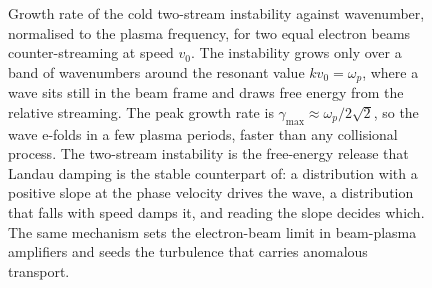 \begin{figure}[htbp]
\centering
{}
\caption[Two-stream instability growth rate]{Growth rate of the cold
two-stream instability against wavenumber, normalised to the plasma
frequency, for two equal electron beams counter-streaming at speed $v_0$.
The instability grows only over a band of wavenumbers around the resonant
value $k v_0 = \omega_p$, where a wave sits still in the beam frame and
draws free energy from the relative streaming. The peak growth rate is
$\gamma_{\max}\approx\omega_p/2\sqrt{2}$, so the wave e-folds in a few plasma
periods, faster than any collisional process. The two-stream instability is
the free-energy release that Landau damping is the stable counterpart of: a
distribution with a positive slope at the phase velocity drives the wave, a
distribution that falls with speed damps it, and reading the slope decides
which. The same mechanism sets the electron-beam limit in beam-plasma
amplifiers and seeds the turbulence that carries anomalous transport.}
\label{fig:vol04ch13:two-stream}
\end{figure}
